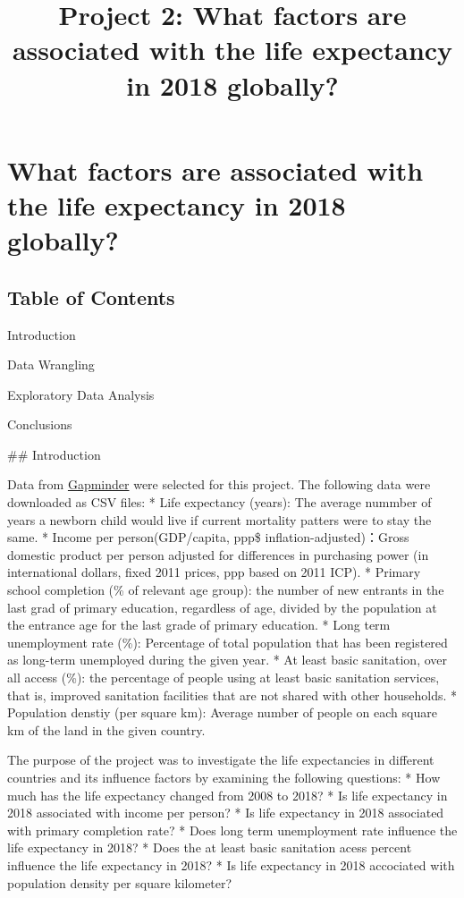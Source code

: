 \documentclass[11pt]{article}
\title{Project 2: What factors are associated with the life expectancy in 2018 globally?}
\begin{document}
    
    
    \maketitle
    
    

    
    \hypertarget{what-factors-are-associated-with-the-life-expectancy-in-2018-globally}{%
\section{What factors are associated with the life expectancy in 2018
globally?}\label{what-factors-are-associated-with-the-life-expectancy-in-2018-globally}}

\hypertarget{table-of-contents}{%
\subsection{Table of Contents}\label{table-of-contents}}

Introduction

Data Wrangling

Exploratory Data Analysis

Conclusions

     \#\# Introduction

Data from \href{https://www.gapminder.org/data/}{Gapminder} were
selected for this project. The following data were downloaded as CSV
files: * Life expectancy (years): The average nummber of years a newborn
child would live if current mortality patters were to stay the same. *
Income per person(GDP/capita, ppp\$ inflation-adjusted)：Gross domestic
product per person adjusted for differences in purchasing power (in
international dollars, fixed 2011 prices, ppp based on 2011 ICP). *
Primary school completion (\% of relevant age group): the number of new
entrants in the last grad of primary education, regardless of age,
divided by the population at the entrance age for the last grade of
primary education. * Long term unemployment rate (\%): Percentage of
total population that has been registered as long-term unemployed during
the given year. * At least basic sanitation, over all access (\%): the
percentage of people using at least basic sanitation services, that is,
improved sanitation facilities that are not shared with other
households. * Population denstiy (per square km): Average number of
people on each square km of the land in the given country.

The purpose of the project was to investigate the life expectancies in
different countries and its influence factors by examining the following
questions: * How much has the life expectancy changed from 2008 to 2018?
* Is life expectancy in 2018 associated with income per person? * Is
life expectancy in 2018 associated with primary completion rate? * Does
long term unemployment rate influence the life expectancy in 2018? *
Does the at least basic sanitation acess percent influence the life
expectancy in 2018? * Is life expectancy in 2018 accociated with
population density per square kilometer?
\end{document}
